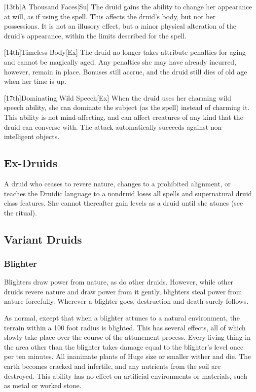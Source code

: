 [13th]{A Thousand Faces}[Su] The druid gains the ability to change her appearance at will, as if using the 
spell.
This affects the druid's body, but not her possessions.
It is not an illusory effect, but a minor physical alteration of the druid's appearance, within the limits described for the spell.

[14th]{Timeless Body}[Ex]
The druid no longer takes attribute penalties for aging and cannot be magically aged.
Any penalties she may have already incurred, however, remain in place.
Bonuses still accrue, and the druid still dies of old age when her time is up.

[17th]{Dominating Wild Speech}[Ex]
When the druid uses her charming wild speech ability, she can dominate the subject (as the 
spell) instead of charming it.
This ability is not mind-affecting, and can affect creatures of any kind that the druid can converse with.
The attack automatically succeeds against non-intelligent objects.

\subsection{Ex-Druids}
A druid who ceases to revere nature, changes to a prohibited alignment, or teaches the Druidic language to a nondruid loses all spells and supernatural druid class features.
She cannot thereafter gain levels as a druid until she atones (see the  ritual).

\subsection{Variant Druids}

\subsubsection{Blighter}

Blighters draw power from nature, as do other druids. However, while other druids revere nature and draw power from it gently, blighters steal power from nature forcefully. Wherever a blighter goes, destruction and death surely follows.

 As normal, except that when a blighter attunes to a natural environment, the terrain within a 100 foot radius is blighted.
This has several effects, all of which slowly take place over the course of the attunement process.
Every living thing in the area other than the blighter takes damage equal to the blighter's level once per ten minutes.
All inanimate plants of Huge size or smaller wither and die.
The earth becomes cracked and infertile, and any nutrients from the soil are destroyed.
This ability has no effect on artificial environments or materials, such as metal or worked stone.

